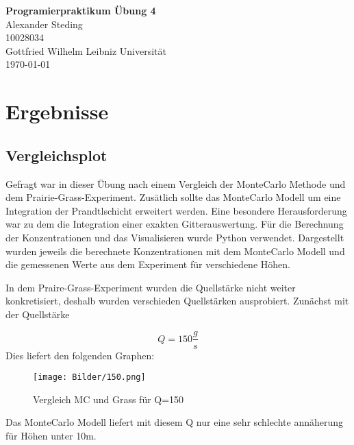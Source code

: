 \documentclass[ngerman]{scrartcl}
\newcommand{\authA}{Alexander Steding}
\begin{document}



\begin{titlepage}
\begin{center}
\vspace{3cm}
{\fontsize{40}{49} \selectfont \textbf{Programierpraktikum Übung 4}}\\[2cm]
\Large{\authA }\\
\Large{10028034 }\\
\large{Gottfried Wilhelm Leibniz Universität\\{\today}}
\end{center}
\end{titlepage}

\newpage


\section{Ergebnisse}
\subsection{Vergleichsplot}
Gefragt war in dieser Übung nach einem Vergleich der MonteCarlo Methode und dem Prairie-Grass-Experiment. Zusätlich sollte das MonteCarlo Modell um eine Integration der Prandtlschicht erweitert werden. Eine besondere Herausforderung war zu dem die Integration einer exakten Gitterauswertung. Für die Berechnung der Konzentrationen und das Visualisieren wurde Python verwendet. Dargestellt wurden jeweils die berechnete Konzentrationen mit dem MonteCarlo Modell und die gemessenen Werte aus dem Experiment für verschiedene Höhen.

In dem Praire-Grass-Experiment wurden die Quellstärke nicht weiter konkretisiert, deshalb wurden verschieden Quellstärken ausprobiert. Zunächst mit der Quellstärke

\begin{equation}
Q= 150 \frac{g}{s}
\end{equation}
Dies liefert den folgenden Graphen: 
\begin{figure}[H]
    \centering
    \texttt{[image: Bilder/150.png]}
    \caption{Vergleich MC und Grass für Q=150}
    \label{fig:my_label}
\end{figure}

Das  MonteCarlo Modell liefert mit diesem Q nur eine sehr schlechte annäherung für Höhen unter 10m.
\end{document}
